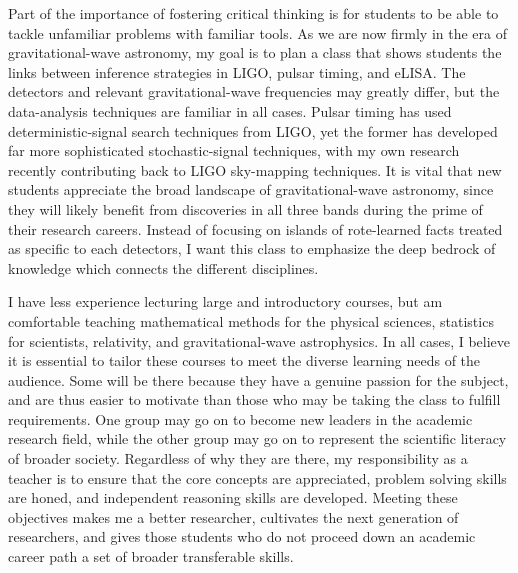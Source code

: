\documentclass[11pt,letterpaper,sans]{moderncv} %
\begin{document}
Part of the importance of fostering critical thinking is for students to be able to tackle unfamiliar problems with familiar tools. %
As we are now firmly in the era of gravitational-wave astronomy, my goal is to plan a class that shows students the links between inference strategies in LIGO, pulsar timing, and eLISA. The detectors and relevant gravitational-wave frequencies may greatly differ, but the data-analysis techniques are familiar in all cases. Pulsar timing has used deterministic-signal search techniques from LIGO, yet the former has developed far more sophisticated stochastic-signal techniques, with my own research recently contributing back to LIGO sky-mapping techniques. It is vital that new students appreciate the broad landscape of gravitational-wave astronomy, since they will likely benefit from discoveries in all three bands during the prime of their research careers. Instead of focusing on islands of rote-learned facts treated as specific to each detectors, I want this class to emphasize the deep bedrock of knowledge which connects the different disciplines. 
\vspace{2mm}

I have less experience lecturing large and introductory courses, but am comfortable teaching mathematical methods for the physical sciences, statistics for scientists, relativity, and gravitational-wave astrophysics. In all cases, I believe it is essential to tailor these courses to meet the diverse learning needs of the audience. Some will be there because they have a genuine passion for the subject, and are thus easier to motivate than those who may be taking the class to fulfill requirements. One group may go on to become new leaders in the academic research field, while the other group may go on to represent the scientific literacy of broader society. Regardless of why they are there, my responsibility as a teacher is to ensure that the core concepts are appreciated, problem solving skills are honed, and independent reasoning skills are developed. Meeting these objectives makes me a better researcher, cultivates the next generation of researchers, and gives those students who do not proceed down an academic career path a set of broader transferable skills.
\end{document}
